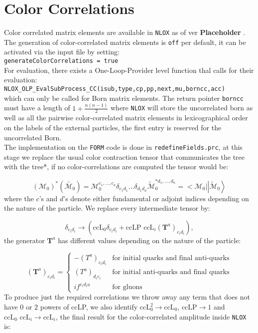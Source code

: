 \documentclass[a4paper]{article}
\def \NLOX{\texttt{NLOX} }
\def \Placeholder{ \textbf{Placeholder }}
\begin{document}
\section{Color Correlations}
Color correlated matrix elements are available in \NLOX as of ver \Placeholder.
The generation of color-correlated matrix elements is \texttt{off} per default, 
it can be activated via the input file by setting:\\

  \texttt{generateColorCorrelations = true}\\

For evaluation, there exists a One-Loop-Provider level function thal calls for their evaluation:\\

  \texttt{NLOX\_OLP\_EvalSubProcess\_CC(isub,type,cp,pp,next,mu,borncc,acc)}\\
  
  
\noindent which can only be called for Born matrix elements. 
The return pointer \texttt{borncc} must have a length of $1+\frac{n(n-1)}{2}$ where \texttt{NLOX} will store 
the uncorrelated born as well as all the pairwise color-correlated matrix elements in lexicographical order on the labels of the external particles, the first entry is reserved for the uncorrelated Born.\\

The implementation on the \texttt{FORM} code is done in \texttt{redefineFields.prc}, at this stage 
we replace the usual color contraction tensor that communicates the tree with the tree*, if no 
color-correlations are computed the tensor would be:

\begin{equation}
 (\mathcal{M}_0)^*(\tilde{\mathcal{M}_0}) = 
 \mathcal{M}_0^{c_1,...,c_n}\delta_{c_1d_1}\dots\delta_{d_1d_n}\tilde{\mathcal{M}}_0^{*d_1,...,d_n} 
 = \Big<\mathcal{M}_0\Big|\left|\mathcal{\tilde M}_0\right>
\end{equation}
where the $c$'s and $d$'s denote either fundamental or adjoint indices depending on the nature 
of the particle. We replace every intermediate tensor by:

\begin{equation}
 \delta_{c_id_i}\rightarrow \left(\text{ccL}_0\delta_{c_id_i}+ \text{ccLP }\text{ccL}_i (\textbf{T}^a)_{c_id_i}\right),
\end{equation}
the generator $\textbf{T}^a$ has different values depending on the nature of the particle:

  \[ 
  (\textbf{T}^a)_{c_id_i} =
  \begin{cases} 
      -(T^a)_{c_id_i} & \text{for initial quarks and final anti-quarks} \\
      (T^a)_{d_ic_i} & \text{for initial anti-quarks and final quarks} \\
      if^{c_id_ia} & \text{for gluons} 
   \end{cases}
  \]
To produce just the required correlations we throw away any term that does not have $0$ or
$2$ powers of ccLP, we also identify $\text{ccL}_0^2\rightarrow \text{ccL}_0$, $\text{ccLP}\rightarrow 1$ and 
$\text{ccL}_0\text{ ccL}_i\rightarrow \text{ccL}_i$, the final result for the color-correlated amplitude inside \NLOX is:
\end{document}
